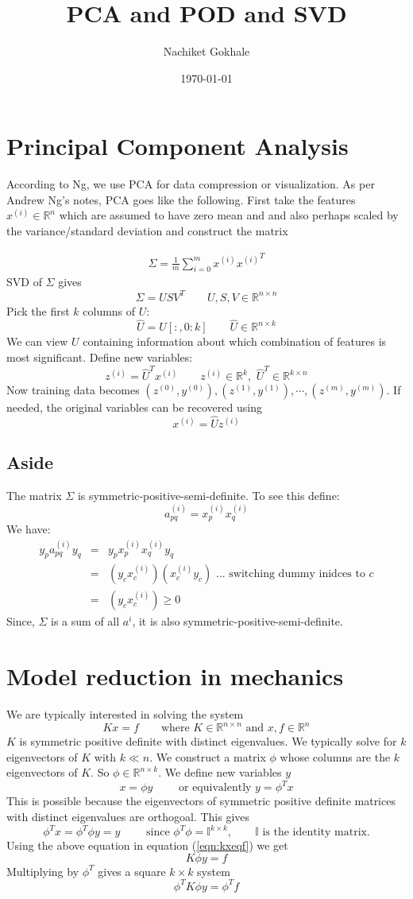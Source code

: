 \documentclass{article}
\newcommand{\beq}{\begin{equation}}
\newcommand{\eeq}{\end{equation}}
\newcommand{\ber}{\begin{eqnarray}}
\newcommand{\eer}{\end{eqnarray}}
\begin{document}
\title{PCA and POD and SVD}
\author{Nachiket Gokhale}
\date{\today}
\maketitle
\section{Principal Component Analysis}
According to Ng, we use PCA for data compression or visualization. As per Andrew Ng's notes, PCA goes like the following. First take the features $x^{(i)} \in \mathbb{R}^n$ which are assumed to have zero mean and and also perhaps scaled by the variance/standard deviation and construct the matrix

\ber
\label{eqn:discretexxt}
\Sigma = \frac{1}{m}\sum_{i=0}^{m}x^{(i)}{x^{(i)}}^{T}
\eer
%
SVD of $\Sigma$ gives
\beq
\Sigma = USV^{T} \qquad U,S,V \in \mathbb{R}^{n\times{n}}
\eeq
Pick the first $k$ columns of $U$:
\beq
\hat{U} = U[:,0:k]  \qquad \hat{U} \in \mathbb{R}^{n\times{k}}
\eeq
We can view $U$ containing information about which combination of features is most significant.
Define new variables:
\beq
z^{(i)}   = {\hat{U}}^{T}x^{(i)} \qquad z^{(i)} \in \mathbb{R}^{k},\,\, {\hat{U}}^{T} \in \mathbb{R}^{k\times{n}}
\eeq
Now training data becomes $(z^{(0)},y^{(0)}), (z^{(1)},y^{(1)}), \cdots, (z^{(m)},y^{(m)})$. If needed, the original variables can be recovered using
\beq
x^{(i)} = \hat{U}z^{(i)}
\eeq

%
%
\subsection{Aside} 
The matrix $\Sigma$ is symmetric-positive-semi-definite. To see this define:
\beq
a_{pq}^{(i)} = x^{(i)}_{p}{x^{(i)}_{q}}
\eeq
We have:
\ber
y_{p}a_{pq}^{(i)}y_{q} &=& y_{p}x^{(i)}_{p}{x^{(i)}_{q}}y_{q}  \\
&=& (y_{c}x^{(i)}_{c})({x^{(i)}_{c}}y_{c}) \text{ ... switching dummy inidces to }c\\
&=& (y_{c}x^{(i)}_{c}) \ge 0
\eer
Since, $\Sigma$ is a sum of all $a^{i}$, it is also symmetric-positive-semi-definite.
\section{Model reduction in mechanics}
We are typically interested in solving the system
\beq
\label{eqn:kxeqf}
Kx = f \qquad \text{where } K\in\mathbb{R}^{n\times{n}} \text{ and } x,f \in \mathbb{R}^n
\eeq
$K$ is symmetric positive definite with distinct eigenvalues. We typically solve for $k$ eigenvectors of $K$ with $k \ll n$. We construct a matrix $\phi$ whose columns are the $k$ eigenvectors of $K$. So $\phi \in \mathbb{R}^{n\times{k}}$. We define new variables $y$
\beq
x = \phi{y} \qquad \text{ or equivalently } y = \phi^Tx
\eeq
This is possible because the eigenvectors of symmetric positive definite matrices with distinct eigenvalues are orthogoal. This gives
\beq
\phi^Tx = \phi^T\phi y = y \qquad \text{ since } \phi^T\phi = \mathbb{I}^{k\times{k}}, \qquad \mathbb{I} \text{ is the identity matrix.}
\eeq
Using the above equation in equation (\ref{eqn:kxeqf}) we get
\beq
K\phi{y} = f
\eeq
Multiplying by $\phi^T$ gives a square $k\times{k}$ system
\beq
\phi^TK\phi{y} = \phi^Tf
\eeq
\end{document}

